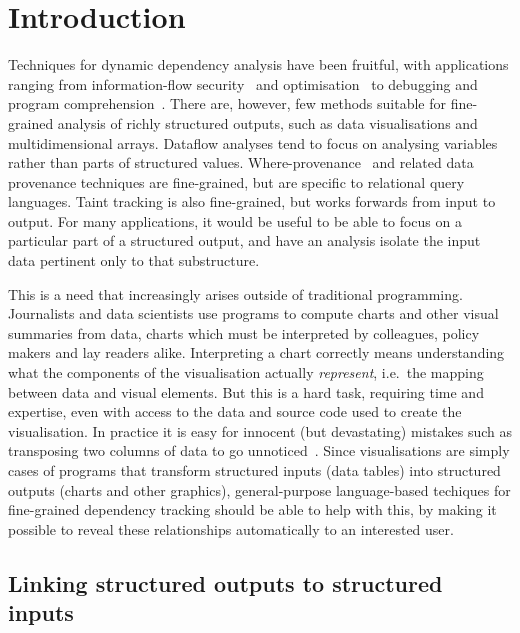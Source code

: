 \section{Introduction}
\label{sec:introduction}

Techniques for dynamic dependency analysis have been fruitful, with applications ranging from information-flow security~\cite{sabelfeld03} and optimisation~\cite{kildall73} to debugging and program comprehension~\cite{weiser81,delucia96}. There are, however, few methods suitable for fine-grained analysis of richly structured outputs, such as data visualisations and multidimensional arrays. Dataflow analyses \cite{reps95} tend to focus on analysing variables rather than parts of structured values. Where-provenance~\cite{buneman01} and related data provenance techniques are fine-grained, but are specific to relational query languages. Taint tracking \cite{newsome05} is also fine-grained, but works forwards from input to output. For many applications, it would be useful to be able to focus on a particular part of a structured output, and have an analysis isolate the input data pertinent only to that substructure.

This is a need that increasingly arises outside of traditional programming. Journalists and data scientists use programs to compute charts and other visual summaries from data, charts which must be interpreted by colleagues, policy makers and lay readers alike. Interpreting a chart correctly means understanding what the components of the visualisation actually \emph{represent}, i.e.~the mapping between data and visual elements. But this is a hard task, requiring time and expertise, even with access to the data and source code used to create the visualisation. In practice it is easy for innocent (but devastating) mistakes such as transposing two columns of data to go unnoticed~\cite{miller06}. Since visualisations are simply cases of programs that transform structured inputs (data tables) into structured outputs (charts and other graphics), general-purpose language-based techiques for fine-grained dependency tracking should be able to help with this, by making it possible to reveal these relationships automatically to an interested user.

\subsection{Linking structured outputs to structured inputs}
\label{sec:introduction:data-linking}

